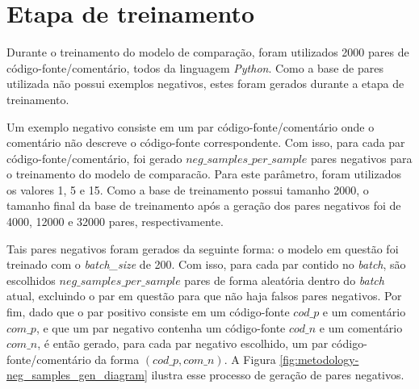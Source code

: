 \section{Etapa de treinamento}
\label{sec:methodology:embedding-comparator-training}
Durante o treinamento do modelo de comparação, foram utilizados 2000 pares de código-fonte/comentário, todos da linguagem \textit{Python}. Como a base de pares utilizada não possui exemplos negativos, estes foram gerados durante a etapa de treinamento.

Um exemplo negativo consiste em um par código-fonte/comentário onde o comentário não descreve o código-fonte correspondente. Com isso, para cada par código-fonte/comentário, foi gerado $neg\_samples\_per\_sample$ pares negativos para o treinamento do modelo de comparacão. Para este parâmetro, foram utilizados os valores 1, 5 e 15. Como a base de treinamento possui tamanho 2000, o tamanho final da base de treinamento após a geração dos pares negativos foi de 4000, 12000 e 32000 pares, respectivamente.

Tais pares negativos foram gerados da seguinte forma: o modelo em questão foi treinado com o \textit{batch\_size} de 200. Com isso, para cada par contido no \textit{batch}, são escolhidos $neg\_samples\_per\_sample$ pares de forma aleatória dentro do \textit{batch} atual, excluindo o par em questão para que não haja falsos pares negativos. Por fim, dado que o par positivo consiste em um código-fonte $cod\_p$ e um comentário $com\_p$, e que um par negativo contenha um código-fonte $cod\_n$ e um comentário $com\_n$, é então gerado, para cada par negativo escolhido, um par código-fonte/comentário da forma $(cod\_p, com\_n)$. A Figura \ref{fig:metodology-neg_samples_gen_diagram} ilustra esse processo de geração de pares negativos.


